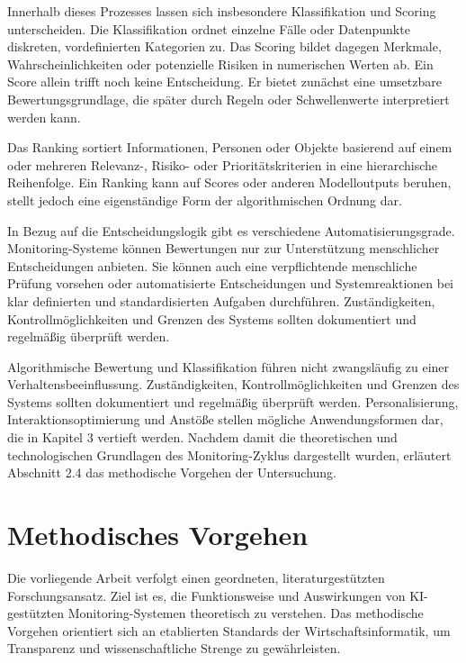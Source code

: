 Innerhalb dieses Prozesses lassen sich insbesondere Klassifikation und Scoring unterscheiden. Die Klassifikation ordnet einzelne Fälle oder Datenpunkte diskreten, vordefinierten Kategorien zu. Das Scoring bildet dagegen Merkmale, Wahrscheinlichkeiten oder potenzielle Risiken in numerischen Werten ab. Ein Score allein trifft noch keine Entscheidung. Er bietet zunächst eine umsetzbare Bewertungsgrundlage, die später durch Regeln oder Schwellenwerte interpretiert werden kann.

Das Ranking sortiert Informationen, Personen oder Objekte basierend auf einem oder mehreren Relevanz-, Risiko- oder Prioritätskriterien in eine hierarchische Reihenfolge. Ein Ranking kann auf Scores oder anderen Modelloutputs beruhen, stellt jedoch eine eigenständige Form der algorithmischen Ordnung dar.

In Bezug auf die Entscheidungslogik gibt es verschiedene Auto\-mati\-sierungs\-grade. Monitoring-Systeme können Bewertungen nur zur Unterstützung menschlicher Entscheidungen anbieten. Sie können auch eine verpflichtende menschliche Prüfung vorsehen oder automatisierte Entscheidungen und Systemreaktionen bei klar definierten und standardisierten Aufgaben durchführen. Zuständigkeiten, Kontroll\-mög\-lich\-kei\-ten und Grenzen des Systems sollten dokumentiert und regelmäßig überprüft werden.

Algorithmische Bewertung und Klassifikation führen nicht zwangsläufig zu einer Verhaltensbeeinflussung. Zuständigkeiten, Kontrollmöglichkeiten und Grenzen des Systems sollten dokumentiert und regelmäßig überprüft werden. Personalisierung, Interaktionsoptimierung und Anstöße stellen mögliche Anwendungsformen dar, die in Kapitel 3 vertieft werden. Nachdem damit die theoretischen und technologischen Grundlagen des Monitoring-Zyklus dargestellt wurden, erläutert Abschnitt 2.4 das methodische Vorgehen der Untersuchung.

\section{Methodisches Vorgehen}

Die vorliegende Arbeit verfolgt einen geordneten, literaturgestützten Forschungsansatz. Ziel ist es, die Funktionsweise und Auswirkungen von \ac{KI}-gestützten Monitoring-Systemen theoretisch zu verstehen. Das methodische Vorgehen orientiert sich an etablierten Standards der Wirtschaftsinformatik, um Transparenz und wissenschaftliche Strenge zu gewährleisten.


